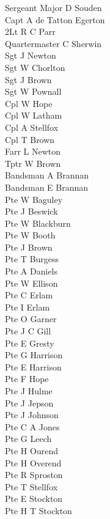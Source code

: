 \begin{multicols}{2}
  \noindent
  Sergeant Major D Souden \\
  Capt A de Tatton Egerton \\
  2Lt R C Parr \\
  Quartermaster C Sherwin \\
  Sgt J Newton \\
  Sgt W Chorlton \\
  Sgt J Brown \\
  Sgt W Pownall \\
  Cpl W Hope \\
  Cpl W Latham \\
  Cpl A Stellfox \\
  Cpl T Brown \\
  Farr L Newton \\
  Tptr W Brown \\
  Bandsman A Brannan \\
  Bandsman E Brannan \\
  Pte W Baguley \\
  Pte J Beswick \\
  Pte W Blackburn \\
  Pte W Booth \\
  Pte J Brown \\
  Pte T Burgess \\
  Pte A Daniels \\
  Pte W Ellison \\
  Pte C Erlam \\
  Pte I Erlam \\
  Pte O Garner \\
  Pte J C Gill \\
  Pte E Gresty \\
  Pte G Harrison \\
  Pte E Harrison \\
  Pte F Hope \\
  Pte J Hulme \\
  Pte J Jepson \\
  Pte J Johnson \\
  Pte C A Jones \\
  Pte G Leech \\
  Pte H Ourend \\
  Pte H Overend \\
  Pte R Sproston \\
  Pte T Stellfox \\
  Pte E Stockton \\
  Pte H T Stockton \\

\end{multicols}
